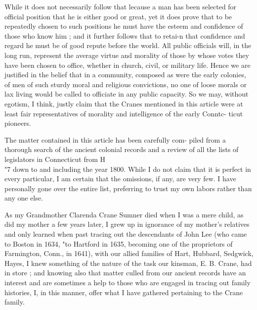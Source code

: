 \documentclass[oneside]{book}
\begin{document}
While it does not necessarily follow that lecause a man has 
been selected for official position that he is either good or great, 
yet it does prove that to be repeatedly chosen to such positions 
he must have the esteem and confidence of those who know him ; 
and it further follows that to retai-n that confidence and regard 
he must be of good repute before the world. All public officials 
will, in the long run, represent the average virtue and morality 
of those by whose votes they have been chosen to office, whether 
in church, civil, or military life. Hence we are justified in the 
belief that in a community, composed as were the early colonies, 
of men of such sturdy moral and religious convictions, no one of 
loose morals or lax living would be called to officiate in any 
public capacity. So we may, without egotism, I think, justly 
claim that the Cranes mentioned in this article were at least fair 
representatives of morality and intelligence of the early Conntc- 
ticut pioneers. 

The matter contained in this article has been carefully com- 
piled from a thorough search of the ancient colonial records and 
a review of all the lists of legislators in Connecticut from H\\"7 
down to and including the year 1800. While I do not claim that 
it is perfect in every particular, I am certain that the omissions, 
if any, are very few. I have personally gone over the entire list, 
preferring to trust my own labors rather than any one else. 




As my Grandmother Clarenda Crane Sumner died when I was 
a mere child, as did my mother a few years later, I grew up in 
ignorance of my mother's relatives and only learned when past 
tracing out the descendants of John Lee (who came to Boston in 
1634, "to Hartford in 1635, becoming one of the proprietors of 
Farmington, Conn., in 1641), with our allied families of Hart, 
Hubbard, Sedgwick, Hayes, I knew something of the nature of 
the task our kinsman, E. B. Crane, had in store ; and knowing 
also that matter culled from our ancient records have an interest 
and are sometimes a help to those who are engaged in tracing out 
family histories, I, in this manner, offer what I have gathered 
pertaining to the Crane family. 
\end{document}
